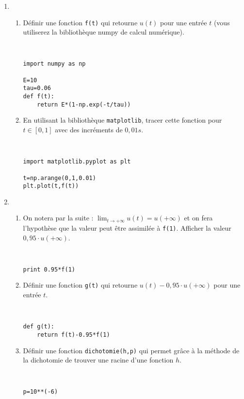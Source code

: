 \documentclass[a4paper,12pt]{article}
\begin{document}
\begin{enumerate}
\item \begin{enumerate}
\item Définir une fonction \verb?f(t)? qui retourne $u(t)$ pour une entrée $t$ (vous utiliserez la bibliothèque numpy de calcul numérique).
\begin{solution}~\ \\
\begin{verbatim}
import numpy as np

E=10
tau=0.06
def f(t):
    return E*(1-np.exp(-t/tau))
\end{verbatim}
\end{solution}
\item En utilisant la bibliothèque \verb?matplotlib?, tracer cette fonction pour $t\in[0,1]$ avec des incréments de $0,01s$.
\begin{solution}~\ \\
\begin{verbatim}
import matplotlib.pyplot as plt

t=np.arange(0,1,0.01)
plt.plot(t,f(t))
\end{verbatim}
\end{solution}
\end{enumerate}
\item \begin{enumerate}
\item On notera par la suite : $\displaystyle \lim_{t\to +\infty}u(t)=u(+\infty)$ et on fera l'hypothèse que la valeur peut être assimilée à \verb?f(1)?. Afficher la valeur $0,95\cdot u(+\infty)$.
\begin{solution}~\ \\
\begin{verbatim}
print 0.95*f(1)
\end{verbatim}
\end{solution}
\item Définir une fonction \verb?g(t)? qui retourne $u(t)-0,95\cdot u(+\infty)$ pour une entrée $t$.
\begin{solution}~\ \\
\begin{verbatim}
def g(t):
    return f(t)-0.95*f(1)
\end{verbatim}
\end{solution}
\item Définir une fonction \verb?dichotomie(h,p)? qui permet grâce à la méthode de la dichotomie de trouver une racine d'une fonction $h$.
\begin{solution}~\ \\
\begin{verbatim}
p=10**(-6)


\end{verbatim}
\end{solution}
\end{enumerate}
\end{enumerate}
\end{document}
